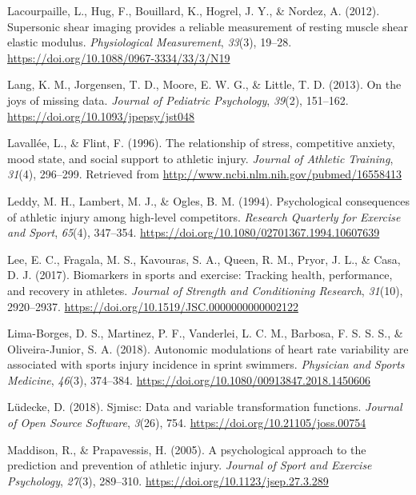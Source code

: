 \documentclass[
  english,
  man,floatsintext]{apa6}
\begin{document}
\leavevmode\hypertarget{ref-Lacourpaille2012}{}%
Lacourpaille, L., Hug, F., Bouillard, K., Hogrel, J. Y., \& Nordez, A. (2012). Supersonic shear imaging provides a reliable measurement of resting muscle shear elastic modulus. \emph{Physiological Measurement}, \emph{33}(3), 19--28. \url{https://doi.org/10.1088/0967-3334/33/3/N19}

\leavevmode\hypertarget{ref-Lang2014}{}%
Lang, K. M., Jorgensen, T. D., Moore, E. W. G., \& Little, T. D. (2013). On the joys of missing data. \emph{Journal of Pediatric Psychology}, \emph{39}(2), 151--162. \url{https://doi.org/10.1093/jpepsy/jst048}

\leavevmode\hypertarget{ref-Lavallee1996}{}%
Lavallée, L., \& Flint, F. (1996). The relationship of stress, competitive anxiety, mood state, and social support to athletic injury. \emph{Journal of Athletic Training}, \emph{31}(4), 296--299. Retrieved from \url{http://www.ncbi.nlm.nih.gov/pubmed/16558413}

\leavevmode\hypertarget{ref-Leddy1994}{}%
Leddy, M. H., Lambert, M. J., \& Ogles, B. M. (1994). Psychological consequences of athletic injury among high-level competitors. \emph{Research Quarterly for Exercise and Sport}, \emph{65}(4), 347--354. \url{https://doi.org/10.1080/02701367.1994.10607639}

\leavevmode\hypertarget{ref-Lee2017}{}%
Lee, E. C., Fragala, M. S., Kavouras, S. A., Queen, R. M., Pryor, J. L., \& Casa, D. J. (2017). Biomarkers in sports and exercise: Tracking health, performance, and recovery in athletes. \emph{Journal of Strength and Conditioning Research}, \emph{31}(10), 2920--2937. \url{https://doi.org/10.1519/JSC.0000000000002122}

\leavevmode\hypertarget{ref-Lima-Borges2018}{}%
Lima-Borges, D. S., Martinez, P. F., Vanderlei, L. C. M., Barbosa, F. S. S. S., \& Oliveira-Junior, S. A. (2018). Autonomic modulations of heart rate variability are associated with sports injury incidence in sprint swimmers. \emph{Physician and Sports Medicine}, \emph{46}(3), 374--384. \url{https://doi.org/10.1080/00913847.2018.1450606}

\leavevmode\hypertarget{ref-R-sjmisc}{}%
Lüdecke, D. (2018). Sjmisc: Data and variable transformation functions. \emph{Journal of Open Source Software}, \emph{3}(26), 754. \url{https://doi.org/10.21105/joss.00754}

\leavevmode\hypertarget{ref-Maddison2005}{}%
Maddison, R., \& Prapavessis, H. (2005). A psychological approach to the prediction and prevention of athletic injury. \emph{Journal of Sport and Exercise Psychology}, \emph{27}(3), 289--310. \url{https://doi.org/10.1123/jsep.27.3.289}
\end{document}
